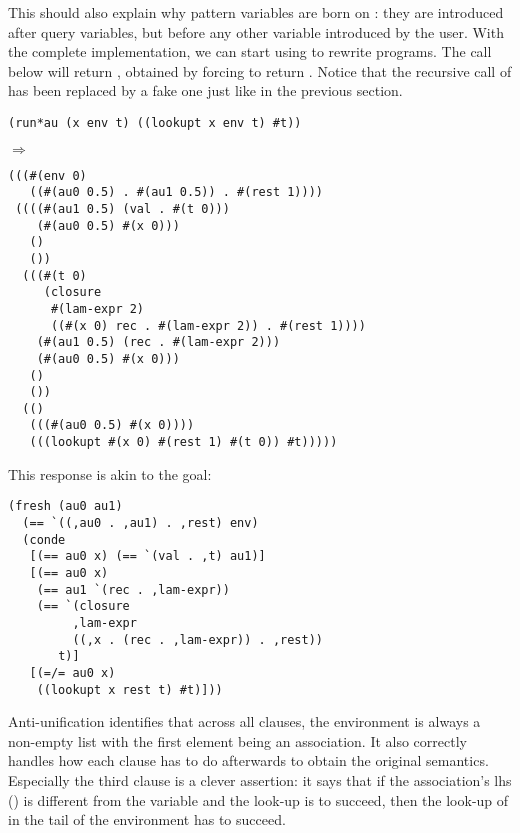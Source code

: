 This should also explain why pattern variables are born on : they are introduced after query variables, but before any other variable introduced by the user. With the complete implementation, we can start using  to rewrite programs. The call below will return , obtained by forcing  to return . Notice that the recursive call of  has been replaced by a fake one just like in the previous section.
\begin{lstlisting}
(run*au (x env t) ((lookupt x env t) #t))
\end{lstlisting}
$\Rightarrow$
\begin{lstlisting}
(((#(env 0) 
   ((#(au0 0.5) . #(au1 0.5)) . #(rest 1))))
 ((((#(au1 0.5) (val . #(t 0)))
    (#(au0 0.5) #(x 0)))
   () 
   ())
  (((#(t 0)
     (closure
      #(lam-expr 2)
      ((#(x 0) rec . #(lam-expr 2)) . #(rest 1))))
    (#(au1 0.5) (rec . #(lam-expr 2)))
    (#(au0 0.5) #(x 0)))
   ()
   ())
  (() 
   (((#(au0 0.5) #(x 0))))
   (((lookupt #(x 0) #(rest 1) #(t 0)) #t)))))
\end{lstlisting}
This response is akin to the goal:
\begin{lstlisting}
(fresh (au0 au1)
  (== `((,au0 . ,au1) . ,rest) env)
  (conde
   [(== au0 x) (== `(val . ,t) au1)]
   [(== au0 x)
    (== au1 `(rec . ,lam-expr))
    (== `(closure
         ,lam-expr
         ((,x . (rec . ,lam-expr)) . ,rest))
       t)]
   [(=/= au0 x)
    ((lookupt x rest t) #t)]))
\end{lstlisting}
Anti-unification identifies that across all clauses, the environment is always a non-empty list with the first element being an association. It also correctly handles how each clause has to do afterwards to obtain the original semantics. Especially the third clause is a clever assertion: it says that if the association's lhs () is different from the variable  and the look-up is to succeed, then the look-up of  in the tail of the environment has to succeed.